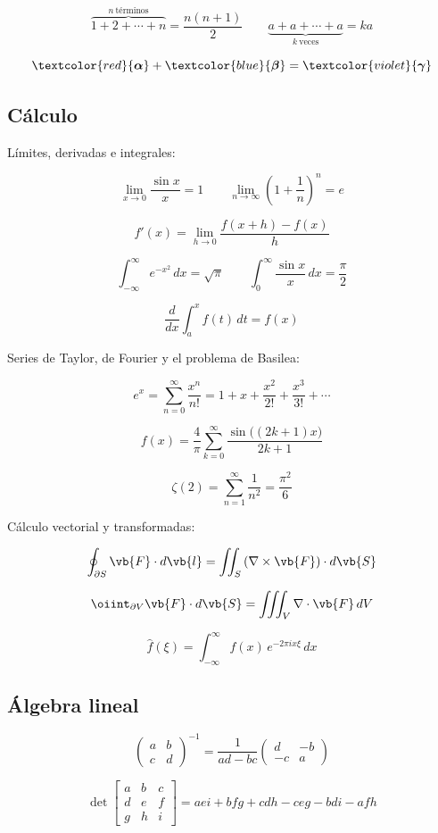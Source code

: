 \[ \overbrace{1+2+\cdots+n}^{n\ \text{términos}}=\frac{n(n+1)}{2} \qquad \underbrace{a+a+\cdots+a}_{k\ \text{veces}}=ka \]

\[ \textcolor{red}{\boldsymbol{\alpha}}+\textcolor{blue}{\boldsymbol{\beta}}=\textcolor{violet}{\boldsymbol{\gamma}} \]

\subsection{Cálculo}

Límites, derivadas e integrales:

\[ \lim_{x\to 0}\frac{\sin x}{x}=1 \qquad \lim_{n\to\infty}\left(1+\frac{1}{n}\right)^n=e \]

\[ f'(x)=\lim_{h\to 0}\frac{f(x+h)-f(x)}{h} \]

\[ \int_{-\infty}^{\infty}e^{-x^2}\,dx=\sqrt{\pi} \qquad \int_{0}^{\infty}\frac{\sin x}{x}\,dx=\frac{\pi}{2} \]

\[ \frac{d}{dx}\int_{a}^{x}f(t)\,dt=f(x) \]

Series de Taylor, de Fourier y el problema de Basilea:

\[ e^x=\sum_{n=0}^{\infty}\frac{x^n}{n!}=1+x+\frac{x^2}{2!}+\frac{x^3}{3!}+\cdots \]

\[ f(x)=\frac{4}{\pi}\sum_{k=0}^{\infty}\frac{\sin\big((2k+1)x\big)}{2k+1} \]

\[ \zeta(2)=\sum_{n=1}^{\infty}\frac{1}{n^2}=\frac{\pi^2}{6} \]

Cálculo vectorial y transformadas:

\[ \oint_{\partial S}\vb{F}\cdot d\vb{l}=\iint_{S}\left(\nabla\times\vb{F}\right)\cdot d\vb{S} \]

\[ \oiint_{\partial V}\vb{F}\cdot d\vb{S}=\iiint_{V}\nabla\cdot\vb{F}\,dV \]

\[ \hat{f}(\xi)=\int_{-\infty}^{\infty}f(x)\,e^{-2\pi i x\xi}\,dx \]

\subsection{Álgebra lineal}

\[ \begin{pmatrix} a & b \\ c & d \end{pmatrix}^{-1}=\frac{1}{ad-bc}\begin{pmatrix} d & -b \\ -c & a \end{pmatrix} \]

\[ \det\begin{bmatrix} a & b & c \\ d & e & f \\ g & h & i \end{bmatrix}=aei+bfg+cdh-ceg-bdi-afh \]

